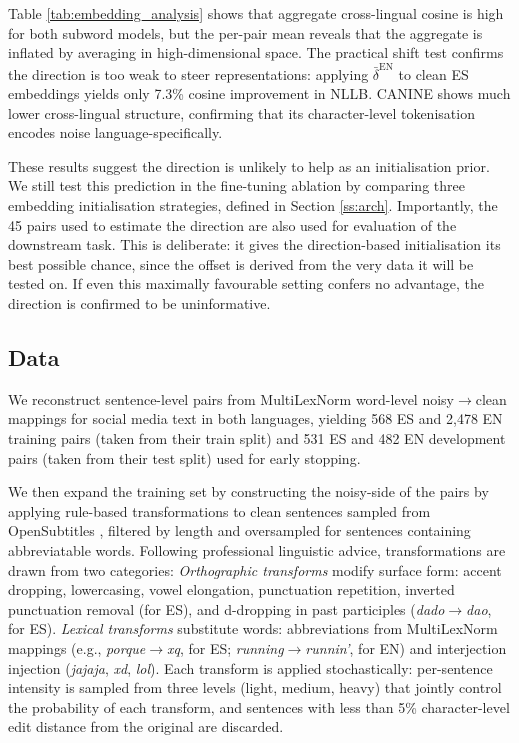 \documentclass[11pt]{article}
\begin{document}
Table \ref{tab:embedding_analysis} shows that aggregate cross-lingual cosine is high for both subword models, but the per-pair mean reveals 
that the aggregate is inflated by averaging in
high-dimensional space. The practical shift test confirms the
direction is too weak to steer representations: applying
$\bar{\delta}^{\text{EN}}$ to clean ES embeddings yields only
7.3\% cosine improvement in NLLB. CANINE shows much lower cross-lingual structure, confirming that its character-level tokenisation encodes noise language-specifically.

These results suggest the direction is unlikely to help as an
initialisation prior. We still test this prediction in the
fine-tuning ablation by comparing three embedding
initialisation strategies, defined in Section
\ref{ss:arch}. Importantly, the 45 pairs used
to estimate the direction are also used for evaluation of the downstream task. This
is deliberate: it gives the direction-based initialisation
its best possible chance, since the offset is derived from the
very data it will be tested on. If even this maximally
favourable setting confers no advantage, the direction is
confirmed to be uninformative.

\subsection{Data}

We reconstruct sentence-level pairs from MultiLexNorm
\citep{vdgoot2021multilexnorm} word-level noisy$\rightarrow$clean mappings for
social media text in both languages, yielding 568 ES and 2,478 EN training pairs (taken from their train split) and 531 ES and 482 EN development pairs (taken from their test split) used for early stopping.

We then expand the training set by constructing the noisy-side of the pairs 
by applying rule-based transformations to clean sentences sampled from
OpenSubtitles \citep{lison2016opensubtitles}, filtered by length and
oversampled for sentences containing abbreviatable words. 
Following professional linguistic advice, transformations are drawn from two categories:
\emph{Orthographic transforms} modify surface form: accent dropping, lowercasing, vowel elongation, punctuation repetition, inverted punctuation removal (for ES), and
d-dropping in past participles (\textit{dado}$\rightarrow$\textit{dao}, for ES).
\emph{Lexical transforms} substitute words: abbreviations from MultiLexNorm
mappings (e.g., \textit{porque}$\rightarrow$\textit{xq}, for ES;
\textit{running}$\rightarrow$\textit{runnin'}, for EN) and interjection injection
(\textit{jajaja}, \textit{xd}, \textit{lol}).
Each transform is applied stochastically: per-sentence intensity is sampled
from three levels (light, medium, heavy) that jointly control the probability
of each transform, and sentences with less than 5\% character-level edit
distance from the original are discarded.
\end{document}
